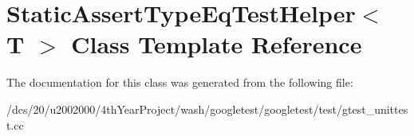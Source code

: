 \hypertarget{classStaticAssertTypeEqTestHelper}{}\section{Static\+Assert\+Type\+Eq\+Test\+Helper$<$ T $>$ Class Template Reference}
\label{classStaticAssertTypeEqTestHelper}


The documentation for this class was generated from the following file\+:\begin{DoxyCompactItemize}
\item 
/dcs/20/u2002000/4th\+Year\+Project/wash/googletest/googletest/test/gtest\+\_\+unittest.\+cc\end{DoxyCompactItemize}
